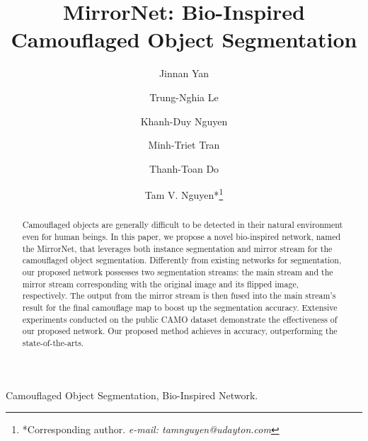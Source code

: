 \documentclass[journal]{IEEEtran}
\begin{document}
\title{MirrorNet: Bio-Inspired Camouflaged Object Segmentation}


\author[1]{Jinnan Yan}
\author[2]{Trung-Nghia Le}
\author[3, 4]{Khanh-Duy Nguyen}
\author[3, 6, 7]{Minh-Triet Tran}
\author[5]{Thanh-Toan Do}
\author[1]{Tam V. Nguyen*\thanks{*Corresponding author. {\it e-mail: tamnguyen@udayton.com}}}













\maketitle

\begin{abstract}
Camouflaged objects are generally difficult to be detected in their natural environment even for human beings. In this paper, we propose a novel bio-inspired network, named the MirrorNet, that leverages both instance segmentation and mirror stream for the camouflaged object segmentation. Differently from existing networks for segmentation, our proposed network possesses two segmentation streams: the main stream and the mirror stream corresponding with the original image and its flipped image, respectively. The output from the mirror stream is then fused into the main stream's result for the final camouflage map to boost up the segmentation accuracy. Extensive experiments conducted on the public CAMO dataset demonstrate the effectiveness of our proposed network. Our proposed method achieves  in accuracy, outperforming the state-of-the-arts.
\end{abstract}

\begin{IEEEkeywords}
Camouflaged Object Segmentation, Bio-Inspired Network.
\end{IEEEkeywords}
\end{document}

